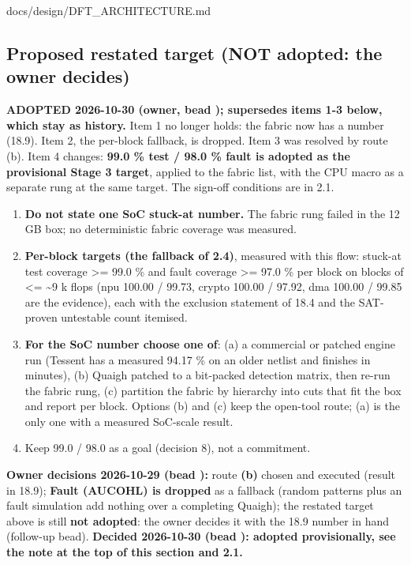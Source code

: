\begin{relocated}{docs/design/DFT_ARCHITECTURE.md}
\subsection{Proposed restated target (NOT adopted: the owner
decides)}\label{tm:ch:dft-architecture:188-proposed-restated-target-not-adopted-the-owner-decides}

\textbf{ADOPTED 2026-10-30 (owner, bead ); supersedes
items 1-3 below, which stay as history.} Item 1 no longer holds: the
fabric now has a number (18.9). Item 2, the per-block fallback, is
dropped. Item 3 was resolved by route (b). Item 4 changes: \textbf{99.0
\% test / 98.0 \% fault is adopted as the provisional Stage 3 target},
applied to the fabric list, with the CPU macro as a separate rung at the
same target. The sign-off conditions are in 2.1.

\begin{enumerate}
\def\labelenumi{\arabic{enumi}.}
\tightlist
\item
  \textbf{Do not state one SoC stuck-at number.} The fabric rung failed
  in the 12 GB box; no deterministic fabric coverage was measured.
\item
  \textbf{Per-block targets (the fallback of 2.4)}, measured with this
  flow: stuck-at test coverage \textgreater= 99.0 \% and fault coverage
  \textgreater= 97.0 \% per block on blocks of \textless=
  \textasciitilde9 k flops (npu 100.00 / 99.73, crypto 100.00 / 97.92,
  dma 100.00 / 99.85 are the evidence), each with the exclusion
  statement of 18.4 and the SAT-proven untestable count itemised.
\item
  \textbf{For the SoC number choose one of}: (a) a commercial or patched
  engine run (Tessent has a measured 94.17 \% on an older netlist and
  finishes in minutes), (b) Quaigh patched to a bit-packed detection
  matrix, then re-run the fabric rung, (c) partition the fabric by
  hierarchy into cuts that fit the box and report per block. Options (b)
  and (c) keep the open-tool route; (a) is the only one with a measured
  SoC-scale result.
\item
  Keep 99.0 / 98.0 as a goal (decision 8), not a commitment.
\end{enumerate}

\textbf{Owner decisions 2026-10-29 (bead ):} route
\textbf{(b)} chosen and executed (result in 18.9); \textbf{Fault
(AUCOHL) is dropped} as a fallback (random patterns plus an
 fault simulation add nothing over a completing Quaigh);
the restated target above is still \textbf{not adopted}: the owner
decides it with the 18.9 number in hand (follow-up bead).
\textbf{Decided 2026-10-30 (bead ): adopted provisionally,
see the note at the top of this section and 2.1.}


\end{relocated}
